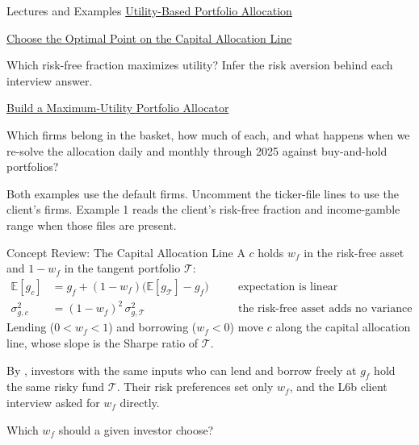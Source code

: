 \documentclass[aspectratio=169,11pt]{beamer}
\newcommand{\E}{\mathbb{E}}
\newcommand{\Tan}{\mathcal{T}}
\newcommand{\repo}{https://github.com/varnerlab/CHEME-5660-CourseRepository-Fall-2026/blob/main/lectures/week-7/L7b}
\begin{document}
\begin{frame}{Lectures and Examples}
\textbf{}
\href{\repo/CHEME-5660-L7b-Lecture-Utility-Allocation-Fall-2026.ipynb}{Utility-Based Portfolio Allocation}

\vspace{0.8em}
\textbf{}
\href{\repo/CHEME-5660-L7b-Example-CAL-Optimal-Allocation-Fall-2026.ipynb}{Choose the Optimal Point on the Capital Allocation Line}

Which risk-free fraction maximizes utility? Infer the risk aversion behind each interview answer.

\vspace{0.8em}
\textbf{}
\href{\repo/CHEME-5660-L7b-Example-Utility-Allocator-Fall-2026.ipynb}{Build a Maximum-Utility Portfolio Allocator}

Which firms belong in the basket, how much of each, and what happens when we re-solve the allocation daily and monthly through 2025 against buy-and-hold portfolios?

\vspace{0.8em}
Both examples use the default firms. Uncomment the ticker-file lines to use the
client's firms. Example 1 reads the client's risk-free fraction and income-gamble
range when those files are present.
\end{frame}

\begin{frame}{Concept Review: The Capital Allocation Line}
  A  $c$ holds $w_f$ in the risk-free asset and $1-w_f$
  in the tangent portfolio $\Tan$:
  \[
    \begin{aligned}
      \E[g_c]&=g_f+(1-w_f)\bigl(\E[g_{\Tan}]-g_f\bigr) &&\quad\text{expectation is linear}\\
      \sigma^2_{g,c}&=(1-w_f)^2\,\sigma^2_{g,\Tan} &&\quad\text{the risk-free asset adds no variance}
    \end{aligned}
  \]
  Lending ($0<w_f<1$) and borrowing ($w_f<0$) move $c$ along the capital
  allocation line, whose slope is the Sharpe ratio of $\Tan$.

  \vspace{0.45em}
  By , investors with the same inputs who can lend and
  borrow freely at $g_f$ hold the same risky fund $\Tan$. Their risk preferences
  set only $w_f$, and the L6b client interview asked for $w_f$ directly.

  \vspace{0.45em}
  Which $w_f$ should a given investor choose?
\end{frame}
\end{document}
